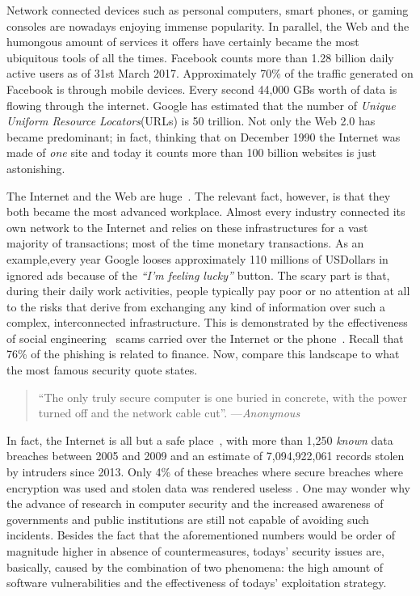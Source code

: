 \documentclass[12pt]{article}
\theoremstyle{definition}
\begin{document}
		Network connected devices such as personal computers, smart phones, or gaming consoles are nowadays enjoying immense popularity. In parallel, the Web and the humongous amount of services it offers have certainly became the most ubiquitous tools of all the times. Facebook counts more than 1.28 billion daily active users as of 31st March 2017. Approximately 70\% of the traffic generated on Facebook is through mobile devices. Every second 44,000 GBs worth of data is flowing through the internet. Google has estimated that the number of \textit{Unique Uniform Resource Locators}(URLs) is 50 trillion. Not only the Web 2.0 has became predominant; in fact, thinking that on December 1990 the Internet was made of \textit{one} site and today it counts more than 100 billion websites is just astonishing.
		
		The Internet and the Web are huge~\cite{torpig}. The relevant fact, however, is that they both became the most advanced workplace. Almost every industry connected its own network to the Internet and relies on these infrastructures for a vast majority of transactions; most of the time monetary transactions. As an example,every year \textsf{Google} looses approximately 110 millions of USDollars in ignored ads because of the \emph{``I'm feeling lucky''} button. The scary part is that, during their daily work activities, people typically pay poor or no attention at all to the risks that derive from exchanging any kind of information over such a complex, interconnected infrastructure. This is demonstrated by the effectiveness of social engineering~\cite{deception} scams carried over the Internet or the phone~\cite{social-engineering-fundamentals}. Recall that 76\% of the phishing is related to finance. Now, compare this landscape to what the most famous security quote states.
		 
		 \begin{quotation}
		 	``The only truly secure computer is one buried in concrete, with the power turned off and the network cable cut''.
		 	---\emph{Anonymous}
		 \end{quotation}
		
		In fact, the Internet is all but a safe place~\cite{whid}, with more than 1,250 \emph{known} data breaches between 2005 and 2009 \cite{breach-data} and an estimate of 7,094,922,061 records stolen by intruders since 2013. Only 4\% of these breaches where secure breaches where encryption was used and stolen data was rendered useless \cite{breach-data}. One may wonder why the advance of research in computer security and the increased awareness of governments and public institutions are still not capable of avoiding such incidents. Besides the fact that the aforementioned numbers would be order of magnitude higher in absence of countermeasures, todays' security issues are, basically, caused by the combination of two phenomena: the high amount of software vulnerabilities and the effectiveness of todays' exploitation strategy.
		
\end{document}

